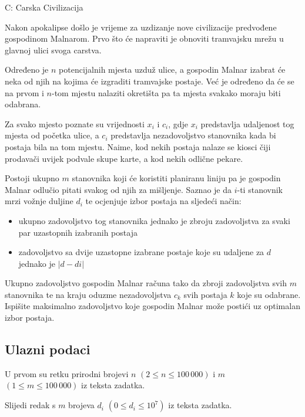\begin{statement}[
  timelimit=1 s,
  memorylimit=512 MiB,
]{C: Carska Civilizacija}

Nakon apokalipse došlo je vrijeme za uzdizanje nove civilizacije predvođene
gospodinom Malnarom. Prvo što će napraviti je obnoviti tramvajsku mrežu u
glavnoj ulici svoga carstva.

Određeno je $n$ potencijalnih mjesta uzduž ulice, a gospodin Malnar izabrat će
neka od njih na kojima će izgraditi tramvajske postaje. Već je određeno da će
se na prvom i $n$-tom mjestu nalaziti okretišta pa ta mjesta svakako moraju
biti odabrana.

Za svako mjesto poznate su vrijednosti $x_i$ i $c_i$, gdje $x_i$ predstavlja
udaljenost tog mjesta od početka ulice, a $c_i$ predstavlja nezadovoljstvo
stanovnika kada bi postaja bila na tom mjestu. Naime, kod nekih postaja
nalaze se kiosci čiji prodavači uvijek podvale skupe karte, a kod nekih
odlične pekare.

Postoji ukupno $m$ stanovnika koji će koristiti planiranu liniju pa je gospodin
Malnar odlučio pitati svakog od njih za mišljenje. Saznao je da $i$-ti
stanovnik mrzi vožnje duljine $d_i$ te ocjenjuje izbor postaja na sljedeći
način:

\begin{itemize}
    \item ukupno zadovoljstvo tog stanovnika jednako je zbroju zadovoljstva za
          svaki par uzastopnih izabranih postaja
    \item zadovoljstvo sa dvije uzastopne izabrane postaje koje su udaljene za
          $d$ jednako je $|d - di|$
\end{itemize}

Ukupno zadovoljstvo gospodin Malnar računa tako da zbroji zadovoljstva svih $m$
stanovnika te na kraju oduzme nezadovoljstva $c_k$ svih postaja $k$ koje su
odabrane. Ispišite maksimalno zadovoljstvo koje gospodin Malnar može postići
uz optimalan izbor postaja.

\subsection*{Ulazni podaci}
 U prvom su retku prirodni brojevi $n$ $(2 \le n \le 100\,000)$ i $m$
$(1 \le m \le 100\,000)$ iz teksta zadatka.

Slijedi redak s $m$ brojeva $d_i$ $(0 \le d_i \le 10^7)$ iz teksta zadatka.


\end{statement}
